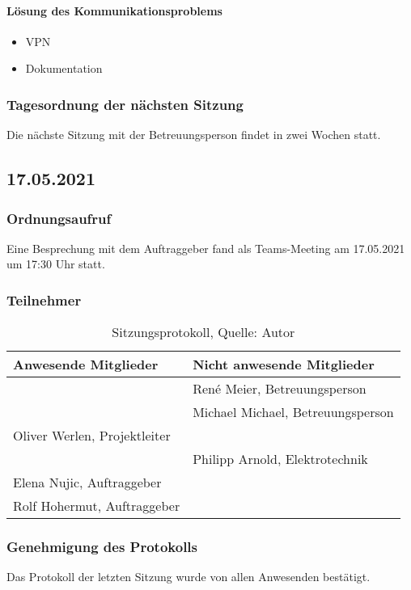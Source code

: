 \paragraph{Lösung des Kommunikationsproblems}
\begin{itemize}
	\item VPN
	\item Dokumentation
\end{itemize}
\subsubsection{Tagesordnung der nächsten Sitzung}
Die nächste Sitzung mit der Betreuungsperson findet in zwei Wochen statt. 
\newpage
\subsection{17.05.2021}
\subsubsection{Ordnungsaufruf}
Eine Besprechung mit dem Auftraggeber fand als Teams-Meeting am 17.05.2021 um 17:30 Uhr statt. 
\subsubsection{Teilnehmer}
\begin{table}[H]
	\setlength\extrarowheight{2pt} %
	\begin{tabularx}{\textwidth}{|X|X|}
		\hline
		\textbf{Anwesende Mitglieder} &  \textbf{Nicht anwesende Mitglieder} \\
		\hline
		&  René Meier, Betreuungsperson   \\
		& Michael Michael, Betreuungsperson   \\
		Oliver Werlen, Projektleiter &  \\
		& Philipp Arnold, Elektrotechnik \\
		Elena Nujic, Auftraggeber &  \\
		Rolf Hohermut, Auftraggeber &  \\
		\hline
	\end{tabularx}
	\caption{ \label{tbl: Teilnehmerliste vom 17.05.2021}Sitzungsprotokoll, Quelle: Autor}
\end{table}
\subsubsection{Genehmigung des Protokolls}
Das Protokoll der letzten Sitzung wurde von allen Anwesenden bestätigt.
